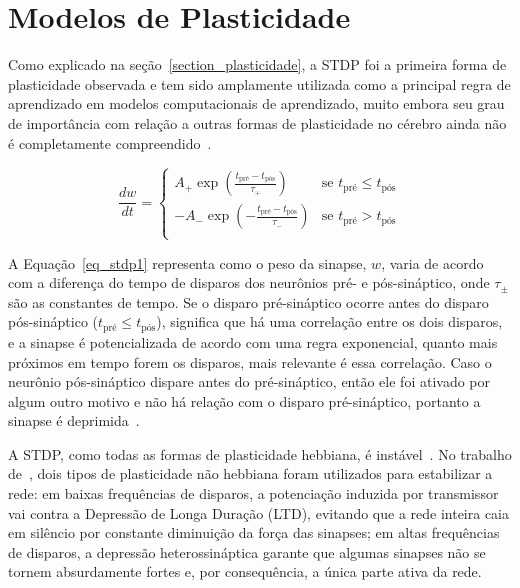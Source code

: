 \section{Modelos de Plasticidade}

Como explicado na seção~\ref{section_plasticidade}, a STDP foi a primeira forma de plasticidade observada e tem sido amplamente
utilizada como a principal regra de aprendizado em modelos computacionais de aprendizado, muito embora seu grau de importância com
relação a outras formas de plasticidade no cérebro ainda não é completamente compreendido~\cite{feldmanSpike2020}.

\begin{equation}
\label{eq_stdp1}
\frac{dw}{dt} = 
\begin{cases}
      A_{+} \exp(\frac{t_{\text{pré}} - t_{\text{pós}}}{\tau_{+}}) & \text{se $t_{\text{pré}} \le t_{\text{pós}}$}\\
      -A_{-} \exp(-\frac{t_{\text{pré}} - t_{\text{pós}}}{\tau_{-}}) & \text{se $t_{\text{pré}} > t_{\text{pós}}$}\\
\end{cases}
\end{equation}

A Equação~\ref{eq_stdp1} representa como o peso da sinapse, $w$, varia de acordo com a diferença do tempo de disparos dos
neurônios pré- e pós-sináptico, onde $\tau_{\pm}$ são as constantes de tempo. Se o disparo pré-sináptico ocorre antes do disparo
pós-sináptico ($t_{\text{pré}} \le t_{\text{pós}}$), significa que há uma correlação entre os dois disparos, e a sinapse é potencializada de
acordo com uma regra exponencial, quanto mais próximos em tempo forem os disparos, mais relevante é essa correlação. Caso o
neurônio pós-sináptico dispare antes do pré-sináptico, então ele foi ativado por algum outro motivo e não há relação com o disparo
pré-sináptico, portanto a sinapse é deprimida~\cite{yamazakiSpiking2022}.

A STDP, como todas as formas de plasticidade hebbiana, é instável~\cite{gerstnerSpiking2002}. No trabalho
de~\cite{zenkeDiverse2015}, dois tipos de plasticidade não hebbiana foram utilizados para estabilizar a rede: em baixas
frequências de disparos, a potenciação induzida por transmissor vai contra a Depressão de Longa Duração (LTD), evitando que a rede
inteira caia em silêncio por constante diminuição da força das sinapses; em altas frequências de disparos, a depressão
heterossináptica garante que algumas sinapses não se tornem absurdamente fortes e, por consequência, a única parte ativa da rede.

